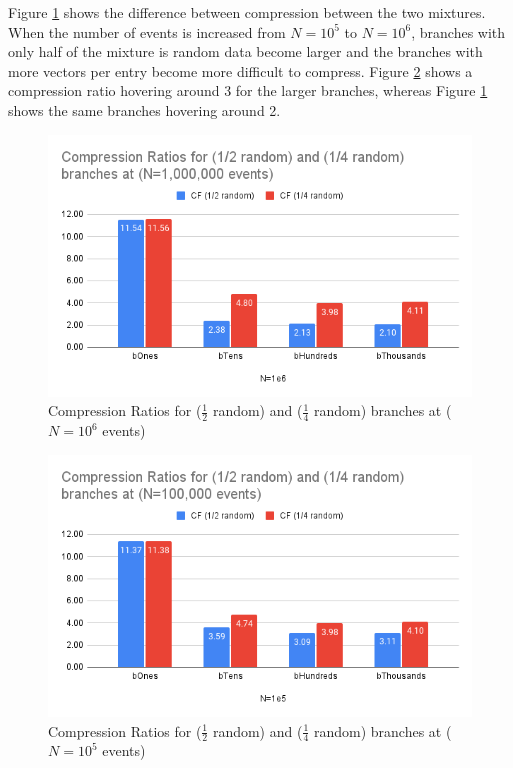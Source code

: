 Figure \ref{fig:toymodel_compF_1e6_mix_random} shows the difference between compression between the two mixtures. 
When the number of events is increased from $N=10^5$ to $N=10^6$, branches with only half of the mixture is random data become larger and the branches with more vectors per entry become more difficult to compress. 
Figure \ref{fig:toymodel_compF_1e5_mix_random} shows a compression ratio hovering around 3 for the larger branches, whereas Figure \ref{fig:toymodel_compF_1e6_mix_random} shows the same branches hovering around 2. 

\begin{figure}[h]
    \centering
    \includegraphics[width=.8\textwidth]{content/toymodel_content/Compression Ratios for (1_2 random) and (1_4 random) branches at (N=1,000,000 events).png}
    \caption{Compression Ratios for ($\frac{1}{2}$ random) and ($\frac{1}{4}$ random) branches at ($N=10^6$ events)}
    \label{fig:toymodel_compF_1e6_mix_random}
\end{figure}

\begin{figure}[h]
    \centering
    \includegraphics[width=.8\textwidth]{content/toymodel_content/Compression Ratios for (1_2 random) and (1_4 random) branches at (N=100,000 events).png}
    \caption{Compression Ratios for ($\frac{1}{2}$ random) and ($\frac{1}{4}$ random) branches at ($N=10^5$ events)}
    \label{fig:toymodel_compF_1e5_mix_random}
\end{figure}

